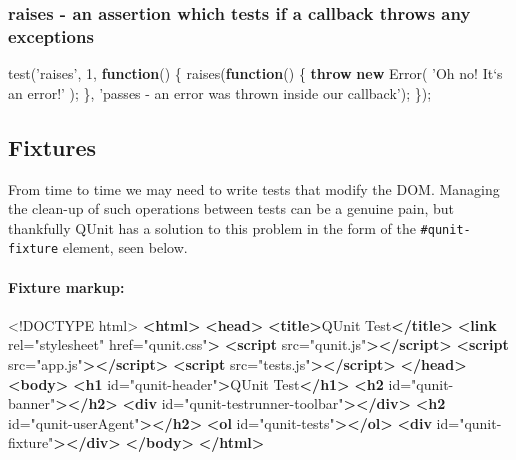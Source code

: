 \documentclass[9pt]{book}
\newenvironment{Shaded}{}{}
\newcommand{\KeywordTok}[1]{\textcolor[rgb]{0.00,0.44,0.13}{\textbf{{#1}}}}
\newcommand{\DataTypeTok}[1]{\textcolor[rgb]{0.56,0.13,0.00}{{#1}}}
\newcommand{\DecValTok}[1]{\textcolor[rgb]{0.25,0.63,0.44}{{#1}}}
\newcommand{\StringTok}[1]{\textcolor[rgb]{0.25,0.44,0.63}{{#1}}}
\newcommand{\OtherTok}[1]{\textcolor[rgb]{0.00,0.44,0.13}{{#1}}}
\newcommand{\FunctionTok}[1]{\textcolor[rgb]{0.02,0.16,0.49}{{#1}}}
\newcommand{\NormalTok}[1]{{#1}}
\begin{document}
\subsubsection{raises - an assertion which tests if a callback throws
any
exceptions}\label{raises---an-assertion-which-tests-if-a-callback-throws-any-exceptions}

\begin{Shaded}
\begin{Highlighting}[]
\FunctionTok{test}\NormalTok{(}\StringTok{'raises'}\NormalTok{, }\DecValTok{1}\NormalTok{, }\KeywordTok{function}\NormalTok{() \{}
  \FunctionTok{raises}\NormalTok{(}\KeywordTok{function}\NormalTok{() \{}
    \KeywordTok{throw} \KeywordTok{new} \FunctionTok{Error}\NormalTok{( }\StringTok{'Oh no! It`s an error!'} \NormalTok{);}
  \NormalTok{\}, }\StringTok{'passes - an error was thrown inside our callback'}\NormalTok{);}
\NormalTok{\});}
\end{Highlighting}
\end{Shaded}

\subsection{Fixtures}\label{fixtures}

From time to time we may need to write tests that modify the DOM.
Managing the clean-up of such operations between tests can be a genuine
pain, but thankfully QUnit has a solution to this problem in the form of
the \texttt{\#qunit-fixture} element, seen below.

\paragraph{Fixture markup:}\label{fixture-markup}

\begin{Shaded}
\begin{Highlighting}[]
\DataTypeTok{<!DOCTYPE }\NormalTok{html}\DataTypeTok{>}
\KeywordTok{<html>}
\KeywordTok{<head>}
    \KeywordTok{<title>}\NormalTok{QUnit Test}\KeywordTok{</title>}
    \KeywordTok{<link}\OtherTok{ rel=}\StringTok{"stylesheet"}\OtherTok{ href=}\StringTok{"qunit.css"}\KeywordTok{>}
    \KeywordTok{<script}\OtherTok{ src=}\StringTok{"qunit.js"}\KeywordTok{></script>}
    \KeywordTok{<script}\OtherTok{ src=}\StringTok{"app.js"}\KeywordTok{></script>}
    \KeywordTok{<script}\OtherTok{ src=}\StringTok{"tests.js"}\KeywordTok{></script>}
\KeywordTok{</head>}
\KeywordTok{<body>}
    \KeywordTok{<h1}\OtherTok{ id=}\StringTok{"qunit-header"}\KeywordTok{>}\NormalTok{QUnit Test}\KeywordTok{</h1>}
    \KeywordTok{<h2}\OtherTok{ id=}\StringTok{"qunit-banner"}\KeywordTok{></h2>}
    \KeywordTok{<div}\OtherTok{ id=}\StringTok{"qunit-testrunner-toolbar"}\KeywordTok{></div>}
    \KeywordTok{<h2}\OtherTok{ id=}\StringTok{"qunit-userAgent"}\KeywordTok{></h2>}
    \KeywordTok{<ol}\OtherTok{ id=}\StringTok{"qunit-tests"}\KeywordTok{></ol>}
    \KeywordTok{<div}\OtherTok{ id=}\StringTok{"qunit-fixture"}\KeywordTok{></div>}
\KeywordTok{</body>}
\KeywordTok{</html>}
\end{Highlighting}
\end{Shaded}
\end{document}
